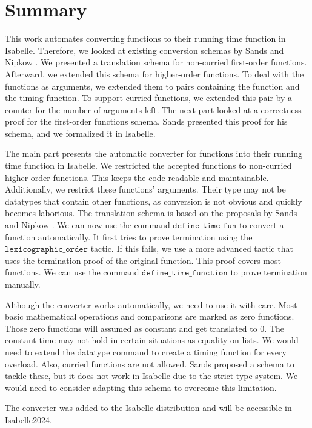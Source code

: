 
\chapter{Summary}\label{chapter:summary}
This work automates converting functions to their running time function in Isabelle.
Therefore, we looked at existing conversion schemas by Sands \parencite{sands} and Nipkow \parencite{fds}.
We presented a translation schema for non-curried first-order functions.
Afterward, we extended this schema for higher-order functions.
To deal with the functions as arguments, we extended them to pairs containing the function and the timing function.
To support curried functions, we extended this pair by a counter for the number of arguments left.
The next part looked at a correctness proof for the first-order functions schema.
Sands presented this proof for his schema, and we formalized it in Isabelle.

The main part presents the automatic converter for functions into their running time function in Isabelle.
We restricted the accepted functions to non-curried higher-order functions.
This keeps the code readable and maintainable.
Additionally, we restrict these functions' arguments.
Their type may not be datatypes that contain other functions, as conversion is not obvious and quickly becomes laborious.
The translation schema is based on the proposals by Sands \parencite{sands} and Nipkow \parencite{fds}.
We can now use the command $\texttt{define\_time\_fun}$ to convert a function automatically.
It first tries to prove termination using the $\texttt{lexicographic\_order}$ tactic.
If this fails, we use a more advanced tactic that uses the termination proof of the original function.
This proof covers most functions.
We can use the command $\texttt{define\_time\_function}$ to prove termination manually.

Although the converter works automatically, we need to use it with care.
Most basic mathematical operations and comparisons are marked as zero functions.
Those zero functions will assumed as constant and get translated to $0$.
The constant time may not hold in certain situations as equality on lists.
We would need to extend the datatype command to create a timing function for every overload.
Also, curried functions are not allowed.
Sands proposed a schema to tackle these, but it does not work in Isabelle due to the strict type system.
We would need to consider adapting this schema to overcome this limitation.

The converter was added to the Isabelle distribution and will be accessible in Isabelle2024.
